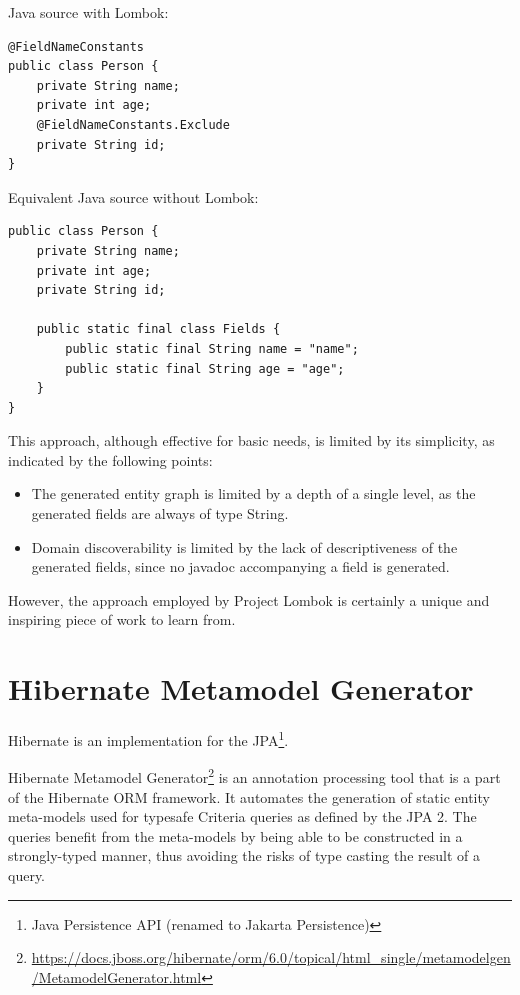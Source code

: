 Java source with Lombok:
\begin{verbatim}
@FieldNameConstants
public class Person {
    private String name;
    private int age;
    @FieldNameConstants.Exclude
    private String id;
}
\end{verbatim}

Equivalent Java source without Lombok:
\begin{verbatim}
public class Person {
    private String name;
    private int age;
    private String id;

    public static final class Fields {
        public static final String name = "name";
        public static final String age = "age";
    }
}
\end{verbatim}

This approach, although effective for basic needs, is limited by its simplicity, as indicated by the following points:
\begin{itemize}
    \item The generated entity graph is limited by a depth of a single level, as the generated fields are always of type String.
    \item Domain discoverability is limited by the lack of descriptiveness of the generated fields, since no javadoc accompanying a field is generated.
\end{itemize}

However, the approach employed by Project Lombok is certainly a unique and inspiring piece of work to learn from.

\section{Hibernate Metamodel Generator}

Hibernate is an implementation for the JPA\footnote{Java Persistence API (renamed to Jakarta Persistence)}.

\n

Hibernate Metamodel Generator\footnote{\url{https://docs.jboss.org/hibernate/orm/6.0/topical/html\_single/metamodelgen/MetamodelGenerator.html}} is an annotation processing tool that is a part of the Hibernate ORM framework. It automates the generation of static entity meta-models used for typesafe Criteria queries as defined by the JPA 2. The queries benefit from the meta-models by being able to be constructed in a strongly-typed manner, thus avoiding the risks of type casting the result of a query.

